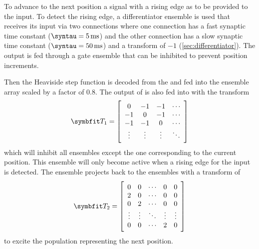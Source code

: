 To advance to the next position a signal with a rising edge as to be provided to the  input.
To detect the rising edge, a differentiator ensemble is used that receives its input via two connections where one connection has a fast synaptic time constant ($\syntau = \SI{5}{\milli\second}$) and the other connection has a slow synaptic time constant ($\syntau = \SI{50}{\milli\second}$) and a transform of $-1$ (\cref{sec:differentiator}).
The output is fed through a gate ensemble that can be inhibited to prevent position increments.

Then the Heaviside step function is decoded from the  and fed into the  ensemble array scaled by a factor of \num{0.8}.
The output of  is also fed into  with the transform
\begin{equation}
    \mat T_1 = \sbr{\begin{array}{cccc}
        0 & -1 & -1 & \cdots \\
        -1 & 0 & -1 & \cdots \\
        -1 & -1 & 0 & \cdots \\
        \vdots & \vdots & \vdots & \ddots
    \end{array}}
\end{equation}
which will inhibit all ensembles except the one corresponding to the current position.
This ensemble will only become active when a rising edge for the  input is detected.
The  ensemble projects back to the  ensembles with a transform of
\begin{equation}
    \mat T_2 = \sbr{\begin{array}{ccccc}
        0 & 0 & \cdots & 0 & 0 \\
        2 & 0 & \cdots & 0 & 0 \\
        0 & 2 & \cdots & 0 & 0 \\
        \vdots & \vdots & \ddots & \vdots & \vdots \\
        0 & 0 & \cdots & 2 & 0
    \end{array}}
\end{equation}
to excite the population representing the next position.

